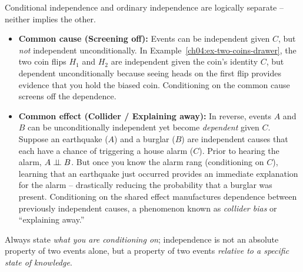 \begin{trapbox}
Conditional independence and ordinary independence are logically separate -- neither implies the other.
\begin{itemize}
\item \textbf{Common cause (Screening off):} Events can be independent given $C$, but \emph{not} independent unconditionally. In Example~\ref{ch04:ex-two-coins-drawer}, the two coin flips $H_1$ and $H_2$ are independent given the coin's identity $C$, but dependent unconditionally because seeing heads on the first flip provides evidence that you hold the biased coin. Conditioning on the common cause screens off the dependence.
\item \textbf{Common effect (Collider / Explaining away):} In reverse, events $A$ and $B$ can be unconditionally independent yet become \emph{dependent} given $C$. Suppose an earthquake ($A$) and a burglar ($B$) are independent causes that each have a chance of triggering a house alarm ($C$). Prior to hearing the alarm, $A \perp\!\!\!\perp B$. But once you know the alarm rang (conditioning on $C$), learning that an earthquake just occurred provides an immediate explanation for the alarm -- drastically reducing the probability that a burglar was present. Conditioning on the shared effect manufactures dependence between previously independent causes, a phenomenon known as \emph{collider bias} or ``explaining away.''
\end{itemize}
Always state \emph{what you are conditioning on}; independence is not an absolute property of two events alone, but a property of two events \emph{relative to a specific state of knowledge}.
\end{trapbox}

